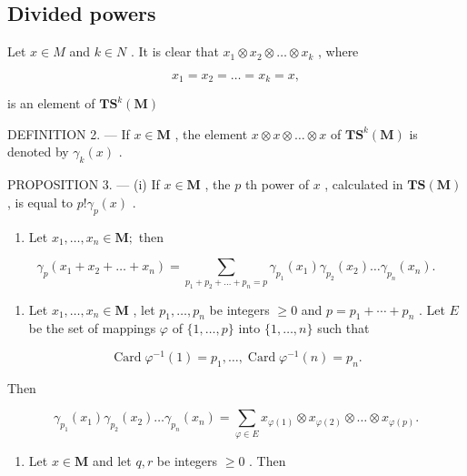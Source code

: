 \subsection{Divided powers}

Let \(x \in M\) and \(k \in N\) . It is clear that \(x_1 \otimes x_2 \otimes \ldots \otimes x_k\) , where

\[
x _ {1} = x _ {2} = \dots = x _ {k} = x,
\]

is an element of \(\mathbf{TS}^k (\mathbf{M})\)

DEFINITION 2. --- If \(x \in \mathbf{M}\) , the element \(x \otimes x \otimes \ldots \otimes x\) of \(\mathbf{T}\mathbf{S}^k(\mathbf{M})\) is denoted by \(\gamma_k(x)\) .

PROPOSITION 3. --- (i) If \(x \in \mathbf{M}\) , the \(p\) th power of \(x\) , calculated in \(\mathbf{T}\mathbf{S}(\mathbf{M})\) , is equal to \(p! \gamma_p(x)\) .

\begin{enumerate}
\def\labelenumi{(\roman{enumi})}
\setcounter{enumi}{1}
\tightlist
\item
  Let \(x_{1},\ldots ,x_{n}\in \mathbf{M};\) then
\end{enumerate}

\[
\gamma_ {p} \left(x _ {1} + x _ {2} + \dots + x _ {n}\right) = \sum_ {p _ {1} + p _ {2} + \dots + p _ {n} = p} \gamma_ {p _ {1}} \left(x _ {1}\right) \gamma_ {p _ {2}} \left(x _ {2}\right) \dots \gamma_ {p _ {n}} \left(x _ {n}\right).
\]

\begin{enumerate}
\def\labelenumi{(\roman{enumi})}
\setcounter{enumi}{2}
\tightlist
\item
  Let \(x_1, \ldots, x_n \in \mathbf{M}\) , let \(p_1, \ldots, p_n\) be integers \(\geqslant 0\) and \(p = p_1 + \cdots + p_n\) . Let \(E\) be the set of mappings \(\varphi\) of \(\{1, \ldots, p\}\) into \(\{1, \ldots, n\}\) such that
\end{enumerate}

\[
\operatorname{Card} \varphi^ {- 1} (1) = p _ {1}, \dots , \operatorname{Card} \varphi^ {- 1} (n) = p _ {n}.
\]

Then

\[
\gamma_ {p _ {1}} (x _ {1}) \gamma_ {p _ {2}} (x _ {2}) \dots \gamma_ {p _ {n}} (x _ {n}) = \sum_ {\varphi \in E} x _ {\varphi (1)} \otimes x _ {\varphi (2)} \otimes \dots \otimes x _ {\varphi (p)}.
\]

\begin{enumerate}
\def\labelenumi{(\roman{enumi})}
\setcounter{enumi}{3}
\tightlist
\item
  Let \(x \in \mathbf{M}\) and let \(q, r\) be integers \(\geqslant 0\) . Then
\end{enumerate}


